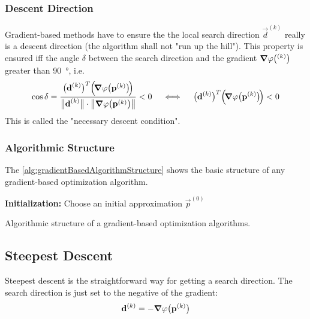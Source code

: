 			\subsubsection{Descent Direction}
				Gradient-based methods have to ensure the the local search direction \(\vec{d}^{(k)}\) really is a descent direction (the algorithm shall not "run up the hill"). This property is ensured iff the angle \( \delta \) between the search direction and the gradient \( \grad{\varphi}\big(\boldsymbol{\mathrm{}}^{(k)}\big) \) greater than \SI{90}{\degree}, i.e.
				\begin{align*}
					\cos \delta = \frac{\big( \boldsymbol{\mathrm{d}}^{(k)} \big)^T \Big(\!\grad{\varphi}\big(\boldsymbol{\mathrm{p}}^{(k)}\big) \!\Big)}{\big\lVert \boldsymbol{\mathrm{d}}^{(k)} \big\rVert \cdot \big\lVert \grad{\varphi}\big(\boldsymbol{\mathrm{p}}^{(k)}\big) \big\rVert} < 0 \quad\iff\quad \big( \boldsymbol{\mathrm{d}}^{(k)} \big)^T \Big(\! \grad{\varphi}\big(\boldsymbol{\mathrm{p}}^{(k)}\big) \!\Big) < 0
				\end{align*}
				This is called the "necessary descent condition".

			\subsubsection{Algorithmic Structure}
				The \autoref{alg:gradientBasedAlgorithmStructure} shows the basic structure of any gradient-based optimization algorithm.
			
				\begin{algorithm}  \DontPrintSemicolon
					\textbf{Initialization:} Choose an initial approximation \(\vec{p}^{(0)}\) \;
				
					\caption{Algorithmic structure of a gradient-based optimization algorithms.}
					\label{alg:gradientBasedAlgorithmStructure}
				\end{algorithm}

		\subsection{Steepest Descent}
			Steepest descent is the straightforward way for getting a search direction. The search direction is just set to the negative of the gradient:
			\begin{align*}
				\boldsymbol{\mathrm{d}}^{(k)} = -\grad{\varphi}\big(\boldsymbol{\mathrm{p}}^{(k)}\big)
			\end{align*}
			
